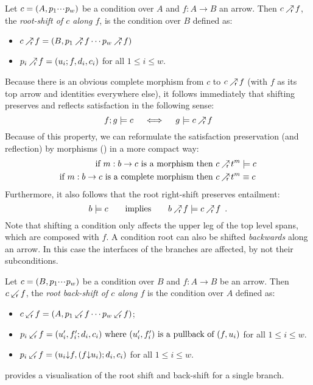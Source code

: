 \begin{definition}
    Let $c = (A,p_1{\cdotp\mkern-2mu\cdotp\mkern-2mu\cdotp\mkern1mu} p_w)$ be a condition over $A$ and $f: A \to B$ an arrow. Then $c\mathbin{\nearrow_{\!\!\!\mathsf r}} f$, the \emph{root-shift of $c$ along $f$}, is the condition over $B$ defined as:
    \begin{itemize}
        \item $c \Rshift f = (B, p_1\Rshift f\cdots p_w\Rshift f)$
        \item $p_i \mathbin{\nearrow_{\!\!\!\mathsf r}} f = (u_i;f,d_i,c_i)$ for all $1\leq i\leq w$.
     \end{itemize}
\end{definition}
%
Because there is an obvious complete morphism from $c$ to $c\mathbin{\nearrow_{\!\!\!\mathsf r}} f$ (with $f$ as its top arrow and identities everywhere else), it follows immediately that shifting preserves and reflects satisfaction in the following sense:
%
\begin{equation}
    \label{eq:shiftPresReflSat}
    f;g \models c \quad \iff\quad  g \models c\mathbin{\nearrow_{\!\!\!\mathsf r}} f
\end{equation} 
%
Because of this property, we can reformulate the satisfaction preservation (and reflection) by morphisms () in a more compact way:
%
\begin{align}
  \mbox{if $m:b \to c$ is a morphism then } &
    c \mathbin{\nearrow_{\!\!\!\mathsf r}} t^m \models c \\
  \mbox{if $m:b \to c$ is a complete morphism then } &
    c \mathbin{\nearrow_{\!\!\!\mathsf r}} t^m \equiv c
\end{align}
%
Furthermore, it also follows that the root right-shift preserves entailment:
%
\[ b\models c \qquad\text{implies}\qquad b\mathbin{\nearrow_{\!\!\!\mathsf r}} f\models c\mathbin{\nearrow_{\!\!\!\mathsf r}} f \enspace. \]
%
Note that shifting a condition only affects the upper leg of the top level spans, which are composed with $f$. A condition root can also be shifted \emph{backwards} along an arrow. In this case the interfaces of the branches are affected, by not their subconditions.  

\begin{definition}
    Let $c = (B,p_1{\cdotp\mkern-2mu\cdotp\mkern-2mu\cdotp\mkern1mu} p_w)$ be a condition over $B$ and $f: A \to B$ be an arrow. Then $c\mathbin{\swarrow_{\!\!\!\mathsf r}} f$, the \emph{root back-shift of $c$ along $f$} is the condition over $A$ defined as:
    \begin{itemize}
    \item $\bshift{c}{f} = (A, p_1\Rbshift f\cdots p_w\Rbshift f)$;
    \item $p_i\mathbin{\swarrow_{\!\!\!\mathsf r}} f = (u'_i,f'_i;d_i,c_i) \mbox{ where } (u'_i,f'_i) \mbox{ is a pullback of } (f,u_i)$ for all $1\leq i\leq w$.
    \item $p_i\mathbin{\swarrow_{\!\!\!\mathsf r}} f = (u_i\mathord{\downarrow} f,(f\mathord{\downarrow} u_i);d_i,c_i)$ for all $1\leq i\leq w$.
    \end{itemize}
\end{definition}
%
 provides a visualisation of the root shift and back-shift for a single branch.

